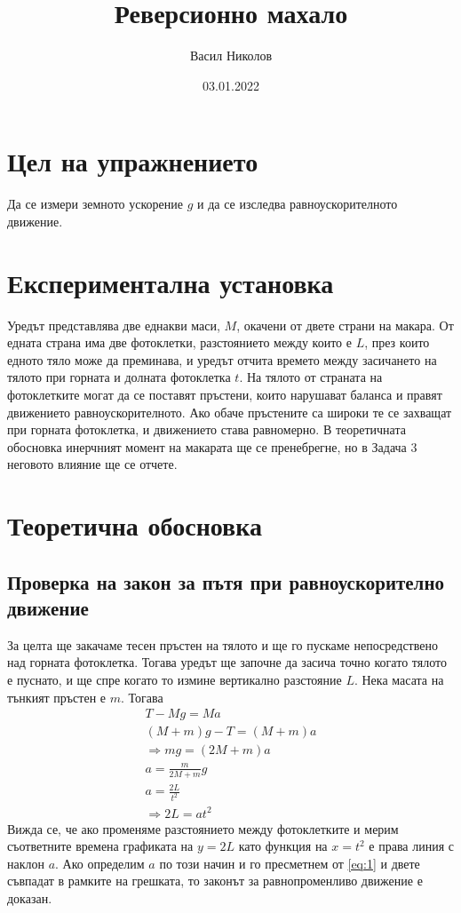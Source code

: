 \documentclass[aps, prb, twocolumn, a4paper, floatfix, reprint]{revtex4-2}
\begin{document}
\title{Реверсионно махало}
\author{Васил Николов}
\noaffiliation
\date{03.01.2022}
\maketitle
\section{Цел на упражнението}
Да се измери земното ускорение $g$ и да се изследва равноускорителното движение. 

\section{Експериментална установка}
Уредът представлява две еднакви маси, $M$, окачени от двете страни на макара. От едната страна има две фотоклетки, разстоянието между които е  $L$, през които едното тяло може да преминава, и уредът отчита времето между засичането на тялото при горната и долната фотоклетка $t$. На тялото от страната на фотоклетките могат да се поставят пръстени, които нарушават баланса и правят движението равноускорителното. Ако обаче пръстените са широки те се захващат при горната фотоклетка, и движението става равномерно. В теоретичната обосновка инерчният момент на макарата ще се пренебрегне, но в Задача 3 неговото влияние ще се отчете. 

\section{Теоретична обосновка}
\subsection{Проверка на закон за пътя при равноускорително движение}
За целта ще закачаме тесен пръстен на тялото и ще го пускаме непосредствено над горната фотоклетка. Тогава уредът ще започне да засича точно когато тялото е пуснато, и ще спре когато то измине вертикално разстояние $L$. Нека масата на тънкият пръстен е $m$. Тогава
\begin{gather*}
    T - Mg = Ma \\
    (M + m)g - T = (M+m)a\\
    \Rightarrow mg = (2M + m)a \\
    a = \frac{m}{2M + m}g \label{eq:1} \tag{1}\\ 
    a = \frac{2L}{t^2} \\
    \Rightarrow 2L = at^2 \label{eq:2} \tag{2}
\end{gather*}
Вижда се, че ако променяме разстоянието между фотоклетките и мерим съответните времена графиката на $y=2L$ като функция на $x=t^2$ е права линия с наклон $a$. Ако определим $a$ по този начин и го пресметнем от \eqref{eq:1} и двете съвпадат в рамките на грешката, то законът за равнопроменливо движение е доказан. 
\end{document}
